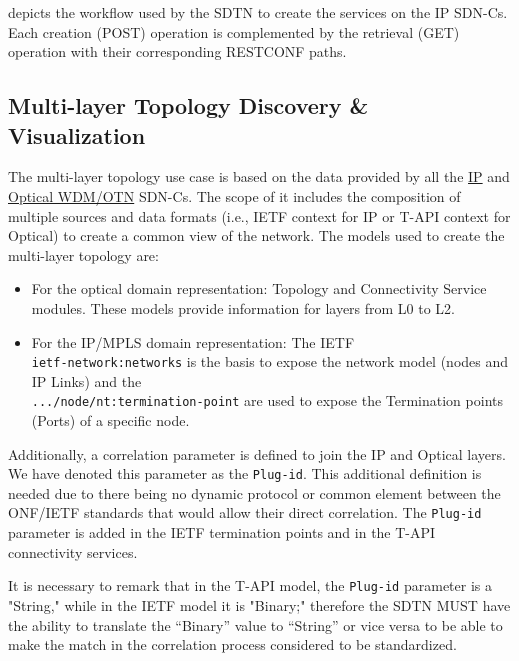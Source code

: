 \documentclass[a4paper,fleqn]{cas-dc}
\begin{document}
 depicts the workflow used by the SDTN to create the services on the IP SDN-Cs. Each creation (POST) operation is complemented by the retrieval (GET) operation with their corresponding RESTCONF paths. 


\subsection{Multi-layer Topology Discovery \& Visualization}

The multi-layer topology use case is based on the data provided by all the \hyperref[subsection:IPtopo]{IP} and \hyperref[subsection:OPTopo]{Optical WDM/OTN} SDN-Cs. The scope of it includes the composition of multiple sources and data formats (i.e., IETF context for IP or T-API context for Optical) to create a common view of the network. The models used to create the multi-layer topology are:
\begin{itemize}
    \item For the optical domain representation: Topology and Connectivity Service modules. These models provide information for layers from L0 to L2.
    \item For the IP/MPLS domain representation: The IETF\\ \texttt{ietf-network:networks} is the basis to expose the network model (nodes and IP Links) and the \\ \texttt{.../node/nt:termination-point} are used to expose the Termination points (Ports) of a specific node.
\end{itemize}
    
Additionally, a correlation parameter is defined to join the IP and Optical layers. We have denoted this parameter as the \texttt{Plug-id}. This additional definition is needed due to there being no dynamic protocol or common element between the ONF/IETF standards that would allow their direct correlation. The \texttt{Plug-id} parameter is added in the IETF termination points and in the T-API connectivity services. 

It is necessary to remark that in the T-API model, the \texttt{Plug-id} parameter is a "String," while in the IETF model it is "Binary;" therefore the SDTN MUST have the ability to translate the “Binary” value to “String” or vice versa to be able to make the match in the correlation process considered to be standardized.
\end{document}
